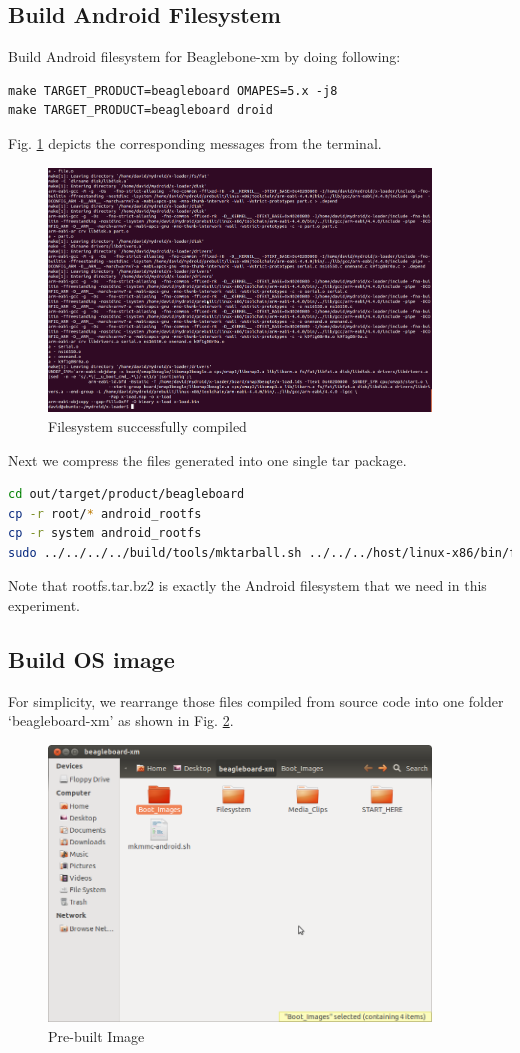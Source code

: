 \documentclass[12pt,journal,draftclsnofoot,onecolumn]{IEEEtran}
\begin{document}
\subsection{Build Android Filesystem}
Build Android filesystem for Beaglebone-xm by doing following:

 \begin{lstlisting}[language={make}]
make TARGET_PRODUCT=beagleboard OMAPES=5.x -j8
make TARGET_PRODUCT=beagleboard droid 
\end{lstlisting}
Fig. \ref{filesystem} depicts the corresponding messages from the terminal.
\begin{figure}[ht]
	\centering
	\includegraphics[width=4in]{./figs/x-loader.png}
	\caption{Filesystem successfully compiled}
	\label{filesystem}
\end{figure}

Next we compress the files generated into one single tar package. 
 \begin{lstlisting}[language={bash}]
cd out/target/product/beagleboard
cp -r root/* android_rootfs
cp -r system android_rootfs
sudo ../../../../build/tools/mktarball.sh ../../../host/linux-x86/bin/fs_get_stats android_rootfs . rootfs rootfs.tar.bz2
\end{lstlisting}
Note that rootfs.tar.bz2 is exactly the Android filesystem that we need in this experiment.

\subsection{Build OS image}
For simplicity, we rearrange those files compiled from source code into one folder `beagleboard-xm' as shown in Fig. \ref{bb-xm}.
\begin{figure}[ht]
	\centering
	\includegraphics[width=4in]{./figs/bb-xm.png}
	\caption{Pre-built Image}
	\label{bb-xm}
\end{figure}
\end{document}
